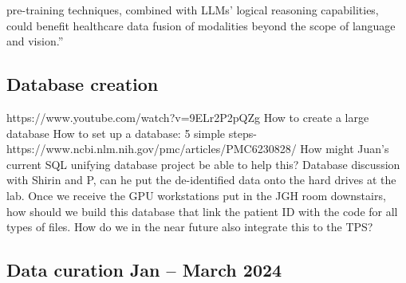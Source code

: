 \documentclass{article}%
\begin{document}
pre{-}training techniques, combined with LLMs’ logical reasoning capabilities, could benefit healthcare data fusion of modalities beyond the scope of language and vision.” %
\newline%
\newline%
%
%
\newline%
\newline%
%
%
\newline%
\newline%
%
%
\newline%
\newline%
%
\subsection{Database creation}%
\label{subsec:Databasecreation}%

%
https://www.youtube.com/watch?v=9ELr2P2pQZg %
\newline%
\newline%
%
How to create a large database %
\newline%
\newline%
%
How to set up a database: 5 simple steps{-} https://www.ncbi.nlm.nih.gov/pmc/articles/PMC6230828/%
\newline%
\newline%
%
How might Juan’s current SQL unifying database project be able to help this?%
\newline%
\newline%
%
Database discussion with Shirin and P, can he put the de{-}identified data onto the hard drives at the lab.%
\newline%
\newline%
%
Once we receive the GPU workstations put in the JGH room downstairs, how should we build this database that link the patient ID with the code for all types of files.%
\newline%
\newline%
%
How do we in the near future also integrate this to the TPS?  %
\newline%
\newline%
%
\subsection{Data curation Jan – March 2024 }%
\label{subsec:DatacurationJanMarch2024}%
\end{document}
